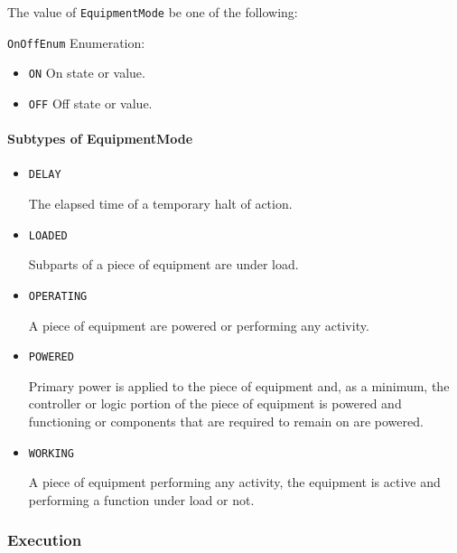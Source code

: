 The value of \texttt{EquipmentMode} \MUST be one of the following: 


\texttt{OnOffEnum} Enumeration:

\begin{itemize}
\item \texttt{ON} \newline On state or value. 
\item \texttt{OFF} \newline Off state or value. 
\end{itemize}


\paragraph{Subtypes of EquipmentMode}\mbox{}
\label{sec:Subtypes of EquipmentMode}

\begin{itemize}

\item \texttt{DELAY}


The elapsed time of a temporary halt of action.

\item \texttt{LOADED}


Subparts of a piece of equipment are under load.

\item \texttt{OPERATING}


A piece of equipment are powered or performing any activity.

\item \texttt{POWERED}


Primary  power is  applied  to the  piece  of  equipment and,  as  a minimum, the controller or logic portion of the piece of equipment is powered and functioning or components that are required to remain on are powered.

\item \texttt{WORKING}


A piece of equipment performing any activity, the equipment is active and performing a function under load or not.


\end{itemize}








\subsubsection{Execution}
\label{sec:Execution}



